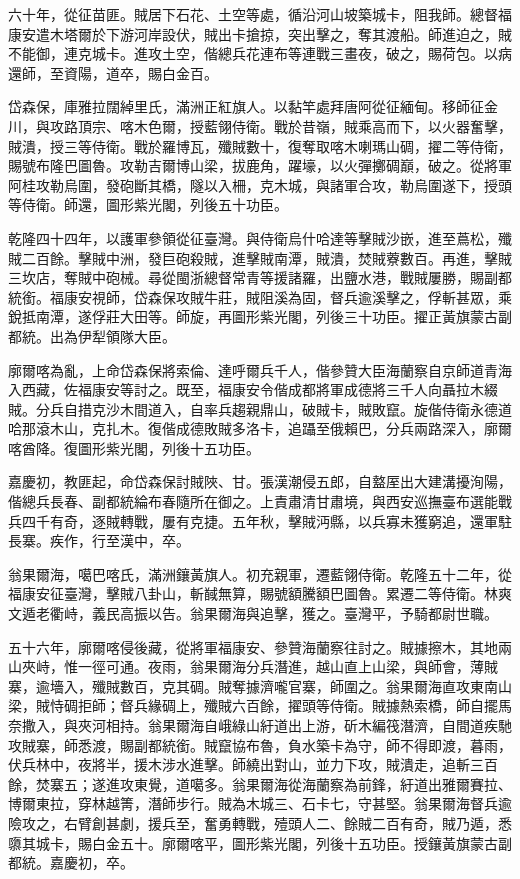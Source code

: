 \begin{pinyinscope}
六十年，從征苗匪。賊居下石花、土空等處，循沿河山坡築城卡，阻我師。總督福康安遣木塔爾於下游河岸設伏，賊出卡搶掠，突出擊之，奪其渡船。師進迫之，賊不能御，連克城卡。進攻土空，偕總兵花連布等連戰三畫夜，破之，賜荷包。以病還師，至資陽，道卒，賜白金百。

岱森保，庫雅拉闊綽里氏，滿洲正紅旗人。以黏竿處拜唐阿從征緬甸。移師征金川，與攻路頂宗、喀木色爾，授藍翎侍衛。戰於昔嶺，賊乘高而下，以火器奮擊，賊潰，授三等侍衛。戰於羅博瓦，殲賊數十，復奪取喀木喇瑪山碉，擢二等侍衛，賜號布隆巴圖魯。攻勒吉爾博山梁，拔鹿角，躍壕，以火彈擲碉巔，破之。從將軍阿桂攻勒烏圍，發砲斷其橋，隧以入柵，克木城，與諸軍合攻，勒烏圍遂下，授頭等侍衛。師還，圖形紫光閣，列後五十功臣。

乾隆四十四年，以護軍參領從征臺灣。與侍衛烏什哈達等擊賊沙嵌，進至蔦松，殲賊二百餘。擊賊中洲，發巨砲殺賊，進擊賊南潭，賊潰，焚賊藔數百。再進，擊賊三坎店，奪賊中砲械。尋從閩浙總督常青等援諸羅，出鹽水港，戰賊屢勝，賜副都統銜。福康安視師，岱森保攻賊牛莊，賊阻溪為固，督兵逾溪擊之，俘斬甚眾，乘銳抵南潭，遂俘莊大田等。師旋，再圖形紫光閣，列後三十功臣。擢正黃旗蒙古副都統。出為伊犁領隊大臣。

廓爾喀為亂，上命岱森保將索倫、達呼爾兵千人，偕參贊大臣海蘭察自京師道青海入西藏，佐福康安等討之。既至，福康安令偕成都將軍成德將三千人向聶拉木綴賊。分兵自措克沙木間道入，自率兵趨親鼎山，破賊卡，賊敗竄。旋偕侍衛永德道哈那滾木山，克扎木。復偕成德敗賊多洛卡，追躡至俄賴巴，分兵兩路深入，廓爾喀酋降。復圖形紫光閣，列後十五功臣。

嘉慶初，教匪起，命岱森保討賊陜、甘。張漢潮侵五郎，自盩厔出大建溝擾洵陽，偕總兵長春、副都統綸布春隨所在御之。上責肅清甘肅境，與西安巡撫臺布選能戰兵四千有奇，逐賊轉戰，屢有克捷。五年秋，擊賊沔縣，以兵寡未獲窮追，還軍駐長寨。疾作，行至漢中，卒。

翁果爾海，噶巴喀氏，滿洲鑲黃旗人。初充親軍，遷藍翎侍衛。乾隆五十二年，從福康安征臺灣，擊賊八卦山，斬馘無算，賜號額騰額巴圖魯。累遷二等侍衛。林爽文遁老衢峙，義民高振以告。翁果爾海與追擊，獲之。臺灣平，予騎都尉世職。

五十六年，廓爾喀侵後藏，從將軍福康安、參贊海蘭察往討之。賊據擦木，其地兩山夾峙，惟一徑可通。夜雨，翁果爾海分兵潛進，越山直上山梁，與師會，薄賊寨，逾墻入，殲賊數百，克其碉。賊奪據濟嚨官寨，師圍之。翁果爾海直攻東南山梁，賊恃碉拒師；督兵緣碉上，殲賊六百餘，擢頭等侍衛。賊據熱索橋，師自擺馬奈撒入，與夾河相持。翁果爾海自峨綠山紆道出上游，斫木編筏潛濟，自間道疾馳攻賊寨，師悉渡，賜副都統銜。賊竄協布魯，負水築卡為守，師不得即渡，暮雨，伏兵林中，夜將半，援木涉水進擊。師繞出對山，並力下攻，賊潰走，追斬三百餘，焚寨五；遂進攻東覺，道噶多。翁果爾海從海蘭察為前鋒，紆道出雅爾賽拉、博爾東拉，穿林越箐，潛師步行。賊為木城三、石卡七，守甚堅。翁果爾海督兵逾險攻之，右臂創甚劇，援兵至，奮勇轉戰，殪頭人二、餘賊二百有奇，賊乃遁，悉隳其城卡，賜白金五十。廓爾喀平，圖形紫光閣，列後十五功臣。授鑲黃旗蒙古副都統。嘉慶初，卒。


\end{pinyinscope}
